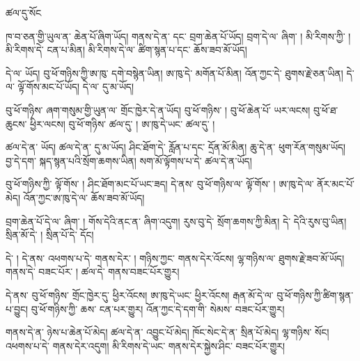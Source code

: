 \documentclass[12pt]{nextbook}
\begin{document}
\begin{readersection}{ཚལ་དུ་སོང}

ཁ་བ་ཅན་གྱི་ཡུལ་ན་  ཆེན་པོ་ཞིག་ཡོད།
གནས་དེ་ན་  དང་ བྲག་ཆེན་པོ་ཡོད།
བྲག་དེ་ལ་  ཞིག་ །
 མི་རིགས་ཀྱི་  །
མི་རིགས་དེ་ ངན་པ་མིན།
མི་རིགས་དེ་ལ་ ཚིག་སྙན་པ་དང་ ཆོས་ཟབ་མོ་ཡོད།

  དེ་ལ་   ཡོད།
བུ་ཕོ་གཉིས་ཀྱི་ཨ་ཁུ་ དགེ་བསྙེན་ཡིན།
ཨ་ཁུ་དེ་ མགོན་པོ་མིན།
འོན་ཀྱང་དེ་ ཐུགས་རྗེ་ཅན་ཡིན།
དེ་ལ་ ལྟོ་གོས་མང་པོ་ཡོད།
དེ་ལ་  དུ་མ་ཡོད།

བུ་ཕོ་གཉིས་ ཞག་གསུམ་གྱི་ཡུན་ལ་ གྲོང་ཁྱེར་དེ་ན་ཡོད།
 བུ་ཕོ་གཉིས་ །
བུ་ཕོ་ཆེན་པོ་ ཡར་ལངས།
བུ་ཕོ་ཐ་ཆུངས་ ཕྱིར་ལངས།
བུ་ཕོ་གཉིས་ ཚལ་དུ་ །
ཨ་ཁུ་དེ་ཡང་ ཚལ་དུ་ །

ཚལ་དེ་ན་   ཡོད།
ཚལ་དེ་ན་  དུ་མ་ཡོད།
ཤིང་ཐོག་དེ་ རློན་པ་དང་ དྲོན་མོ་མིན།
ཆུ་དེ་ན་ ཕུག་རོན་གསུམ་ཡོད།
བྱ་དེ་དག་ སྐད་སྙན་པའི་སྲོག་ཆགས་ཡིན།
སག་མོ་ལྟོགས་པ་དེ་ ཚལ་དེ་ན་ཡོད།

བུ་ཕོ་གཉིས་ཀྱི་ ལྟོ་གོས་ །
ཤིང་ཐོག་མང་པོ་ཡང་ཟད།
དེ་ནས་ བུ་ཕོ་གཉིས་ལ་ ལྟོ་གོས་ །
ཨ་ཁུ་དེ་ལ་ ནོར་མང་པོ་མེད།
འོན་ཀྱང་ཨ་ཁུ་དེ་ལ་ ཆོས་ཟབ་མོ་ཡོད།

བྲག་ཆེན་པོ་དེ་ལ་   ཞིག་ །
གོས་དེའི་ནང་ན་  ཞིག་འདུག།
རུས་བུ་དེ་ སྲོག་ཆགས་ཀྱི་མིན།
དེ་  དེའི་རུས་བུ་ཡིན།
སྲིན་མོ་དེ་ །
སྲིན་པོ་དེ་  དོང།

 དེ་ །
དེ་ནས་ འཕགས་པ་དེ་ གནས་དེར་ །
 གཉིས་ཀྱང་ གནས་དེར་འོངས།
ལྷ་གཉིས་ལ་ ཐུགས་རྗེ་ཟབ་མོ་ཡོད།
གནས་དེ་ བཟང་པོར་ །
ཚལ་དེ་ གནས་བཟང་པོར་གྱུར།

དེ་ནས་ བུ་ཕོ་གཉིས་ གྲོང་ཁྱེར་དུ་ ཕྱིར་འོངས།
ཨ་ཁུ་དེ་ཡང་ ཕྱིར་འོངས།
རྒན་མོ་དེ་ལ་ བུ་ཕོ་གཉིས་ཀྱི་ཚིག་སྙན་པ་བྱུང།
བུ་ཕོ་གཉིས་ཀྱི་ ཆས་ ངན་པར་གྱུར།
འོན་ཀྱང་དེ་དག་གི་ སེམས་ བཟང་པོར་གྱུར།

གནས་དེ་ན་ ཉེས་པ་ཆེན་པོ་མེད།
ཚལ་དེ་ན་ འབྱུང་པོ་མེད།
ཁོང་སེང་དེ་ན་ སྲིན་པོ་མེད།
ལྷ་གཉིས་  སོང།
འཕགས་པ་དེ་ གནས་དེར་འདུག།
མི་རིགས་དེ་ཡང་ གནས་དེར་སྐྱེས་ཤིང་ བཟང་པོར་གྱུར།

\end{readersection}
\end{document}

